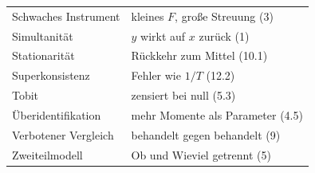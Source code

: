 \begin{merksatz}
\begin{center}
{\begin{longtable}{@{}P{3.6cm}P{5.0cm}@{}}
Schwaches Instrument & kleines $F$, große Streuung (3)\\
Simultanität & $y$ wirkt auf $x$ zurück (1)\\
Stationarität & Rückkehr zum Mittel (10.1)\\
Superkonsistenz & Fehler wie $1/T$ (12.2)\\
Tobit & zensiert bei null (5.3)\\
Überidentifikation & mehr Momente als Parameter (4.5)\\
Verbotener Vergleich & behandelt gegen behandelt (9)\\
Zweiteilmodell & Ob und Wieviel getrennt (5)\\
\bottomrule
\end{longtable}}
\end{center}
\end{merksatz}
